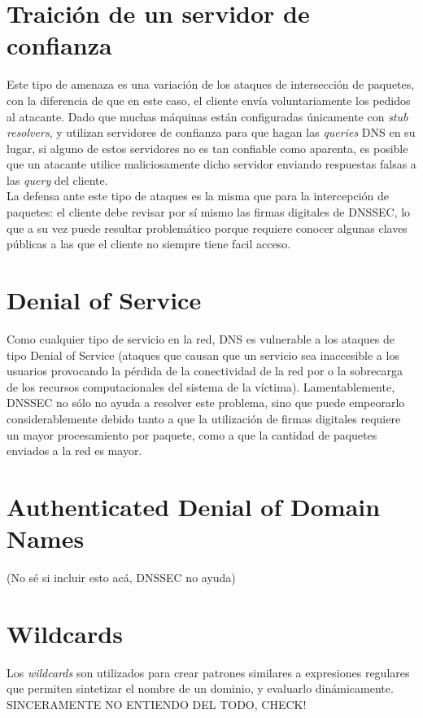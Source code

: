 \section{Traici\'on de un servidor de confianza}
Este tipo de amenaza es una variación de los ataques de intersección de paquetes, con la diferencia de que en este caso, el cliente envía voluntariamente los pedidos al atacante. Dado que muchas máquinas están configuradas únicamente con \textit{stub resolvers}, y utilizan servidores de confianza para que hagan las \textit{queries} DNS en su lugar, si alguno de estos servidores no es tan confiable como aparenta, es posible que un atacante utilice maliciosamente dicho servidor enviando respuestas falsas a las \textit{query} del cliente.\\
La defensa ante este tipo de ataques es la misma que para la intercepción de paquetes: el cliente debe revisar por sí mismo las firmas digitales de DNSSEC, lo que a su vez puede resultar problemático porque requiere conocer algunas claves públicas a las que el cliente no siempre tiene facil acceso.


\section{Denial of Service}
Como cualquier tipo de servicio en la red, DNS es vulnerable a los ataques de tipo Denial of Service (ataques que causan que un servicio sea inaccesible a los usuarios provocando la pérdida de la conectividad de la red por o la sobrecarga de los recursos computacionales del sistema de la víctima\cite{dos06}). Lamentablemente, DNSSEC no sólo no ayuda a resolver este problema, sino que puede empeorarlo considerablemente debido tanto a que la utilización de firmas digitales requiere un mayor procesamiento por paquete, como a que la cantidad de paquetes enviados a la red es mayor.


\section{Authenticated Denial of Domain Names}

(No s\'e si incluir esto ac\'a, DNSSEC no ayuda)

\section{Wildcards}

Los \textit{wildcards} son utilizados para crear patrones similares a expresiones regulares que permiten sintetizar el nombre de un dominio, y evaluarlo din\'amicamente\cite{rfc1034}. SINCERAMENTE NO ENTIENDO DEL TODO, CHECK!
